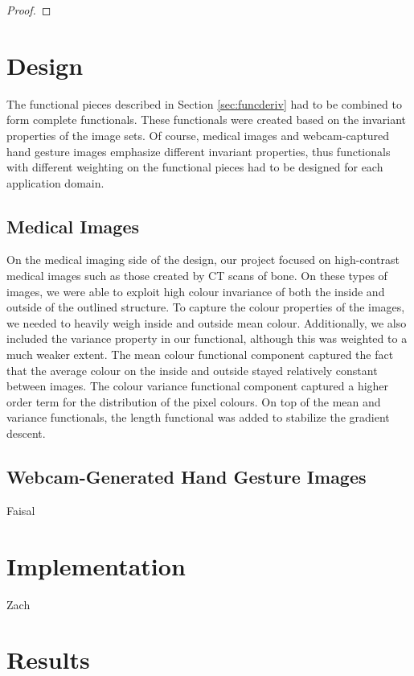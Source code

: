 \documentclass{article}
\begin{document}
			\begin{proof}
				
			\end{proof}

	\section{Design}
	The functional pieces described in Section \ref{sec:funcderiv} had to be combined to form complete functionals. These functionals were created based on the invariant properties of the image sets. Of course, medical images and webcam-captured hand gesture images emphasize different invariant properties, thus functionals with different weighting on the functional pieces had to be designed for each application domain.

		\subsection{Medical Images}
		On the medical imaging side of the design, our project focused on high-contrast medical images such as those created by CT scans of bone. On these types of images, we were able to exploit high colour invariance of both the inside and outside of the outlined structure. To capture the colour properties of the images, we needed to heavily weigh inside and outside mean colour. Additionally, we also included the variance property in our functional, although this was weighted to a much weaker extent. The mean colour functional component captured the fact that the average colour on the inside and outside stayed relatively constant between images. The colour variance functional component captured a higher order term for the distribution of the pixel colours. On top of the mean and variance functionals, the length functional was added to stabilize the gradient descent.



		\subsection{Webcam-Generated Hand Gesture Images}
			Faisal

	\section{Implementation}
		Zach

	\section{Results}
		
\end{document}
